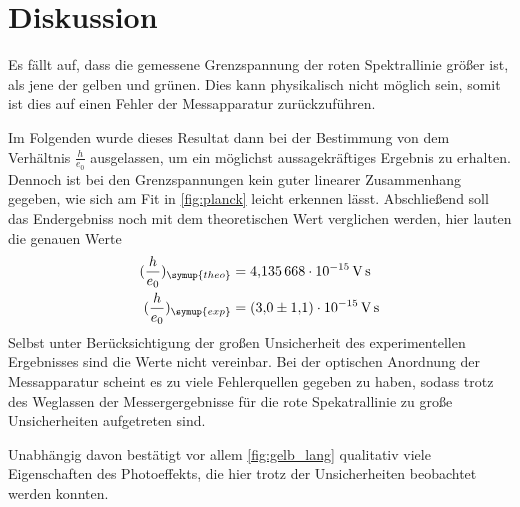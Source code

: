 \section{Diskussion}
\label{sec:Diskussion}

Es fällt auf, dass die gemessene Grenzspannung der roten Spektrallinie größer ist, als jene der gelben und grünen.
Dies kann physikalisch nicht möglich sein, somit ist dies auf einen Fehler der Messapparatur zurückzuführen.

Im Folgenden wurde dieses Resultat dann bei der Bestimmung von dem Verhältnis $\frac{h}{e_0}$ ausgelassen,
um ein möglichst aussagekräftiges Ergebnis zu erhalten.
Dennoch ist bei den Grenzspannungen kein guter linearer Zusammenhang gegeben, wie sich am Fit in
\autoref{fig:planck} leicht erkennen lässt.
Abschließend soll das Endergebniss noch mit dem theoretischen Wert verglichen werden, hier lauten die genauen Werte
\begin{align*}
    (\frac{h}{e_0})_{\symup{theo}} &= \qty{4.135668e-15}{\volt\second}\\
    (\frac{h}{e_0})_{\symup{exp}} &= \qty{3.0(1.1)e-15}{\volt\second}
\end{align*}
Selbst unter Berücksichtigung der großen Unsicherheit des experimentellen Ergebnisses sind die Werte nicht vereinbar.
Bei der optischen Anordnung der Messapparatur scheint es zu viele Fehlerquellen gegeben zu haben, sodass trotz
des Weglassen der Messergergebnisse für die rote Spekatrallinie zu große Unsicherheiten aufgetreten sind.

Unabhängig davon bestätigt vor allem \autoref{fig:gelb_lang} qualitativ viele Eigenschaften des Photoeffekts,
die hier trotz der Unsicherheiten beobachtet werden konnten.